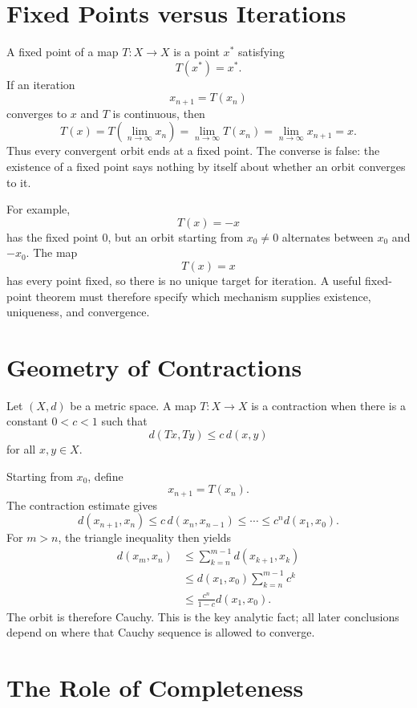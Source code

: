
\section{Fixed Points versus Iterations}

A fixed point of a map \(T:X\to X\) is a point \(x^*\) satisfying
\[
  T(x^*)=x^*.
\]
If an iteration
\[
  x_{n+1}=T(x_n)
\]
converges to \(x\) and \(T\) is continuous, then
\[
  T(x)=T\left(\lim_{n\to\infty}x_n\right)
  =\lim_{n\to\infty}T(x_n)
  =\lim_{n\to\infty}x_{n+1}
  =x.
\]
Thus every convergent orbit ends at a fixed point.  The converse is false: the existence of a fixed point says nothing by itself about whether an orbit converges to it.

For example,
\[
  T(x)=-x
\]
has the fixed point \(0\), but an orbit starting from \(x_0\ne0\) alternates between \(x_0\) and \(-x_0\).  The map
\[
  T(x)=x
\]
has every point fixed, so there is no unique target for iteration.  A useful fixed-point theorem must therefore specify which mechanism supplies existence, uniqueness, and convergence.

\section{Geometry of Contractions}

Let \((X,d)\) be a metric space.  A map \(T:X\to X\) is a contraction when there is a constant \(0<c<1\) such that
\[
  d(Tx,Ty)\le c\,d(x,y)
\]
for all \(x,y\in X\).

Starting from \(x_0\), define
\[
  x_{n+1}=T(x_n).
\]
The contraction estimate gives
\[
  d(x_{n+1},x_n)
  \le c\,d(x_n,x_{n-1})
  \le\cdots\le c^n d(x_1,x_0).
\]
For \(m>n\), the triangle inequality then yields
\[
\begin{aligned}
  d(x_m,x_n)
  &\le\sum_{k=n}^{m-1}d(x_{k+1},x_k)\\
  &\le d(x_1,x_0)\sum_{k=n}^{m-1}c^k\\
  &\le\frac{c^n}{1-c}d(x_1,x_0).
\end{aligned}
\]
The orbit is therefore Cauchy.  This is the key analytic fact; all later conclusions depend on where that Cauchy sequence is allowed to converge.

\section{The Role of Completeness}

